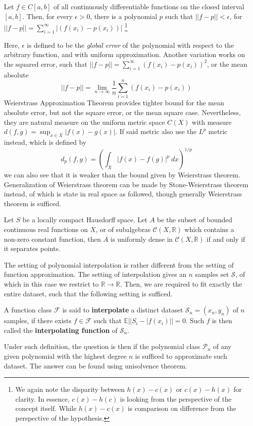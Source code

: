 \documentclass[
  journal=largetwo,
  year=2025,
  volume=37,
]{cup-journal}
\begin{document}
\begin{theorem}
    Let $f\in C[a,b]$ of all continuously differentiable functions on the closed interval $[a,b]$. Then, for every $\epsilon > 0$, there is a polynomial $p$ such that $||f-p||< \epsilon$, for $||f-p||=\sum_{i=1}^{\infty}|(f(x_{i})-p(x_{i}))|$ \footnote{We again note the disparity between $h(x)-c(x)$ or $c(x)-h(x)$ for clarity. In essence, $c(x)-h(c)$ is looking from the perspective of the concept itself. While $h(x)-c(x)$ is comparison on difference from the perspective of the hypothesis.}
\end{theorem}
Here, $\epsilon$ is defined to be the \textit{global error} of the polynomial with respect to the arbitrary function, and with uniform approximation. Another variation works on the squared error, such that $||f-p||=\sum_{i=1}^{\infty}(f(x_{i})-p(x_{i}))^{2}$, or the mean absolute $$||f-p||=\lim_{n\to\infty}\frac{1}{n}\sum_{i=1}^{n}(f(x_{i})-p(x_{i}))$$
Weierstrass Approximation Theorem provides tighter bound for the mean absolute error, but not the square error, or the mean square case. Nevertheless, they are natural measure on the uniform metric space $C(X)$ with measure $d(f,g)=\sup_{x\in X}|f(x)-g(x)|$. If said metric also use the $L^{p}$ metric instead, which is defined by 
\begin{equation}
    d_{p}(f,g) = \left(\int_{X}|f(x)-f(g)|^{p}\:dx\right)^{1/p}
\end{equation}
we can also see that it is weaker than the bound given by Weierstrass theorem. Generalization of Weierstrass theorem can be made by Stone-Weierstrass theorem instead, of which is state in real space as followed, though generally Weierstrass theorem is sufficed.
\begin{theorem}
  Let $S$ be a locally compact Hausdorff space. Let $A$ be the subset of bounded continuous real functions on $X$, or of subalgebras $\mathcal{C}(X,\mathbb{R})$ which contains a non-zero constant function, then $A$ is uniformly dense in $\mathcal{C}(X,\mathbb{R})$ if and only if it separates points. 
\end{theorem}
The setting of polynomial interpolation is rather different from the setting of function approximation. The setting of interpolation gives an $n$ samples set $\mathcal{S}$, of which in this case we restrict to $\mathbb{R}\to\mathbb{R}$. Then, we are required to fit exactly the entire dataset, such that the following setting is sufficed. 
\begin{definition}[Interpolation]
    A function class $\mathcal{F}$ is said to \textbf{interpolate} a distinct dataset $\mathcal{S}_{n}=(x_{n},y_{n})$ of $n$ samples, if there exists $f\in \mathcal{F}$ such that $\mathbb{E}||S_{i}-|f(x_{i})||= 0$. Such $f$ is then called the \textbf{interpolating function} of $\mathcal{S}_{n}$. 
\end{definition}
Under such definition, the question is then if the polynomial class $\mathcal{P}_{n}$ of any given polynomial with the highest degree $n$ is sufficed to approximate such dataset. The answer can be found using unisolvence theorem.
\end{document}
